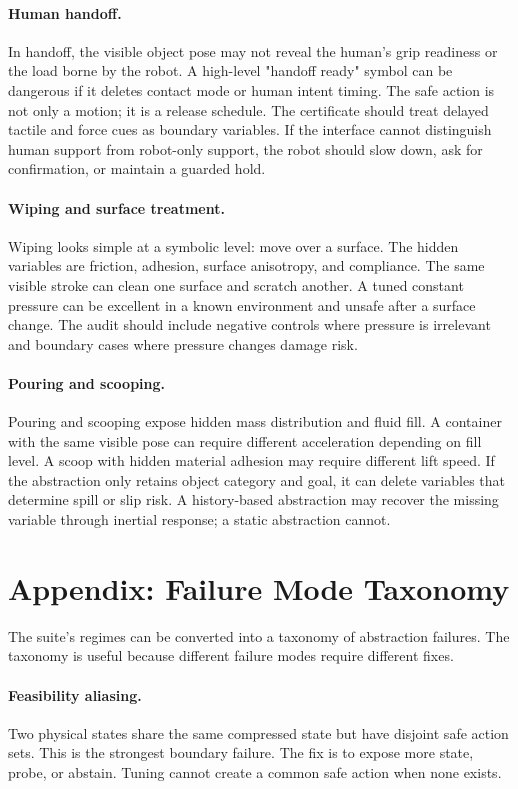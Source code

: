 \documentclass{article}
\begin{document}
\paragraph{Human handoff.}
In handoff, the visible object pose may not reveal the human's grip readiness or
the load borne by the robot. A high-level "handoff ready" symbol can be dangerous
if it deletes contact mode or human intent timing. The safe action is not only a
motion; it is a release schedule. The certificate should treat delayed tactile
and force cues as boundary variables. If the interface cannot distinguish human
support from robot-only support, the robot should slow down, ask for confirmation,
or maintain a guarded hold.

\paragraph{Wiping and surface treatment.}
Wiping looks simple at a symbolic level: move over a surface. The hidden variables
are friction, adhesion, surface anisotropy, and compliance. The same visible
stroke can clean one surface and scratch another. A tuned constant pressure can
be excellent in a known environment and unsafe after a surface change. The audit
should include negative controls where pressure is irrelevant and boundary cases
where pressure changes damage risk.

\paragraph{Pouring and scooping.}
Pouring and scooping expose hidden mass distribution and fluid fill. A container
with the same visible pose can require different acceleration depending on fill
level. A scoop with hidden material adhesion may require different lift speed. If
the abstraction only retains object category and goal, it can delete variables
that determine spill or slip risk. A history-based abstraction may recover the
missing variable through inertial response; a static abstraction cannot.

\section{Appendix: Failure Mode Taxonomy}

The suite's regimes can be converted into a taxonomy of abstraction failures.
The taxonomy is useful because different failure modes require different fixes.

\paragraph{Feasibility aliasing.}
Two physical states share the same compressed state but have disjoint safe action
sets. This is the strongest boundary failure. The fix is to expose more state,
probe, or abstain. Tuning cannot create a common safe action when none exists.
\end{document}
